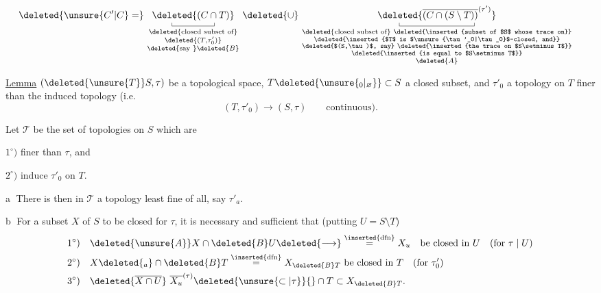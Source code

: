 \[
\begin{aligned}
 &\deleted{\unsure{C'|C}=}\ \underset{\substack{\text{\deleted{closed subset of}}\\\deleted{(T,\tau'_0)}\\\text{\deleted{say }}\deleted{B}}}{\underset{\rule{.35pt}{.35em}\rule{4.4em}{.35pt}\rule{.35pt}{.35em}}{\deleted{(C\cap T)}}}
 \ \deleted{\cup}\ 
 \underset{\substack{\text{\deleted{closed subset of} \deleted{\inserted{subset of $S$ whose trace on}}}\\
 \text{\deleted{\inserted{$T$ is $\unsure{\tau'_0|\tau_0}$-closed, and}}}\\
 \text{\deleted{$(S,\tau)$, say} \deleted{\inserted{the trace on $S\setminus T$}}}\\
 \text{\deleted{\inserted{is equal to $S\setminus T$}}}\\\deleted{A}}}{\underset{\rule{.35pt}{.35em}\rule{7.8em}{.35pt}\rule{.35pt}{.35em}}{\deleted{\overline{(C\cap(S\setminus T))}^{(\tau')}}}}
\end{aligned}
\]

\uline{Lemma}\quad {} $(\deleted{\unsure{T}}S,\tau)$ be a topological space, $T\deleted{\unsure{_0|_{\varnothing}}}\subset S$ a closed subset, and $\tau'_0$ a topology  on $T$ finer than the induced topology (i.e.
\[
 (T,\tau'_0)\mathbin{\longrightarrow}(S,\tau)\qquad\text{continuous).}
\]


 Let \uline{$\mathscr{T}$} be the set of topologies on $S$ which are

$1^\circ)$ finer than $\tau$, and

$2^\circ)$ induce $\tau'_0$ on $T$.

\textcircled{a} There is then in \uline{$\mathscr T$} a topology least fine of all, say $\tau'_{a}$.

\textcircled{b} For a subset $X$ of $S$ to be closed for $\tau$, it is necessary and sufficient that (putting $U=S\setminus T$)
\[
\begin{aligned}
1^\circ)\quad &\deleted{\unsure{A}}X\cap \deleted{B}U\deleted{\longrightarrow}\overset{\inserted{\mathrm{dfn}}}{=}X_{u}\quad\text{be closed in }U\quad(\text{for }\tau\mid U)\\
2^\circ)\quad &X\deleted{_a}\cap\deleted{B}T\overset{\inserted{\mathrm{dfn}}}{=}X_{\deleted{B}T}\ \text{be closed in }T\quad(\text{for }\tau'_0)\\
3^\circ)\quad &\deleted{\overline{X\cap U}}\ \overline{X_u}^{(\tau)}\deleted{\unsure{\subset|\tau}}{}\cap T\subset X_{\deleted{B}T}.
\end{aligned}
\]
